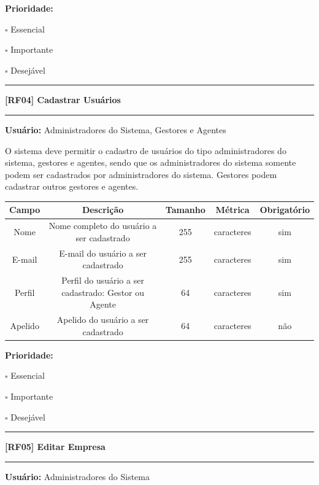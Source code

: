 \documentclass{scrreprt}
\begin{document}
	\textbf{Prioridade: }\begin{itemize*}
		\item[\hspace{1cm}\rlap{\raisebox{0.2ex}{\hspace{0.4ex}\scriptsize \ding{56}}}$\square$]
		Essencial
		\item[\hspace{1cm}$\square$]
		Importante
		\item[\hspace{1cm}$\square$]
		Desejável
	\end{itemize*}
	
	\begin{center}
		\noindent\rule{16cm}{0.4pt}
		\textbf{[RF04] Cadastrar Usuários}
		\noindent\rule{16cm}{0.4pt}
	\end{center}
	\textbf{Usuário:} Administradores do Sistema, Gestores e Agentes
	
	O sistema deve permitir o cadastro de usuários do tipo administradores do sistema, gestores e agentes, sendo que os administradores do 
	sistema somente podem ser cadastrados por administradores do sistema. Gestores podem cadastrar outros gestores e agentes.
	
	\begin{center}
		\begin{adjustbox}{width=\textwidth}      \begin{tabular}{ |c|c|c|c|c| } 
			\hline
			\rowcolor{lightgray} Campo & Descrição & Tamanho & Métrica & Obrigatório \\
			\hline
			Nome & Nome completo do usuário a ser cadastrado & 255 & caracteres & sim \\ 
			\hline
			E-mail & E-mail do usuário a ser cadastrado & 255 & caracteres & sim \\ 
			\hline
			Perfil & Perfil do usuário a ser cadastrado: Gestor ou Agente & 64 & caracteres & sim \\ 
			\hline
			Apelido & Apelido do usuário a ser cadastrado & 64 & caracteres & não \\
			\hline
		\end{tabular}    \end{adjustbox}
	\end{center}
	
	\textbf{Prioridade: }\begin{itemize*}
		\item[\hspace{1cm}\rlap{\raisebox{0.2ex}{\hspace{0.4ex}\scriptsize \ding{56}}}$\square$]
		Essencial
		\item[\hspace{1cm}$\square$]
		Importante
		\item[\hspace{1cm}$\square$]
		Desejável
	\end{itemize*}
	\begin{center}
		\noindent\rule{16cm}{0.4pt}
		\textbf{[RF05] Editar Empresa}
		\noindent\rule{16cm}{0.4pt}
	\end{center}
	\textbf{Usuário:} Administradores do Sistema
	
\end{document}
